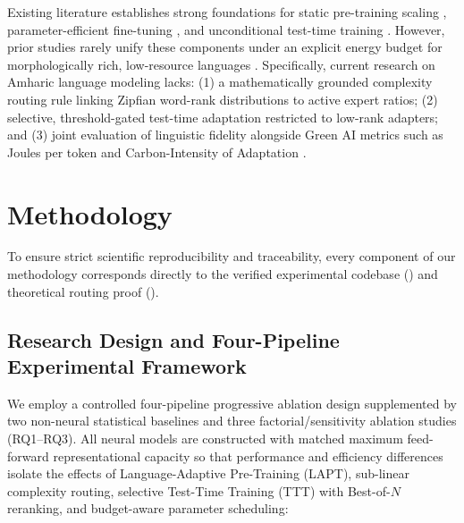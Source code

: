 \documentclass{interact}
\begin{document}
Existing literature establishes strong foundations for static pre-training scaling \cite{ref9,ref15}, parameter-efficient fine-tuning \cite{ref59}, and unconditional test-time training \cite{ref35}. However, prior studies rarely unify these components under an explicit energy budget for morphologically rich, low-resource languages \cite{ref5,ref13,ref14,ref54,ref55,ref56}. Specifically, current research on Amharic language modeling lacks: (1) a mathematically grounded complexity routing rule linking Zipfian word-rank distributions to active expert ratios; (2) selective, threshold-gated test-time adaptation restricted to low-rank adapters; and (3) joint evaluation of linguistic fidelity alongside Green AI metrics such as Joules per token and Carbon-Intensity of Adaptation \cite{ref21,ref26}.


\section{Methodology}
\label{sec:methodology}

To ensure strict scientific reproducibility and traceability, every component of our methodology corresponds directly to the verified experimental codebase () and theoretical routing proof ().

\subsection{Research Design and Four-Pipeline Experimental Framework}
\label{subsec:research_design}

We employ a controlled four-pipeline progressive ablation design supplemented by two non-neural statistical baselines and three factorial/sensitivity ablation studies (RQ1--RQ3). All neural models are constructed with matched maximum feed-forward representational capacity so that performance and efficiency differences isolate the effects of Language-Adaptive Pre-Training (LAPT), sub-linear complexity routing, selective Test-Time Training (TTT) with Best-of-$N$ reranking, and budget-aware parameter scheduling:
\end{document}
